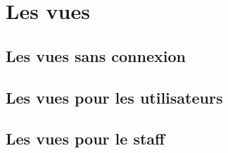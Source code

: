\part{Les vues}

\chapter{Les vues sans connexion}







\chapter{Les vues pour les utilisateurs}





\chapter{Les vues pour le staff}










